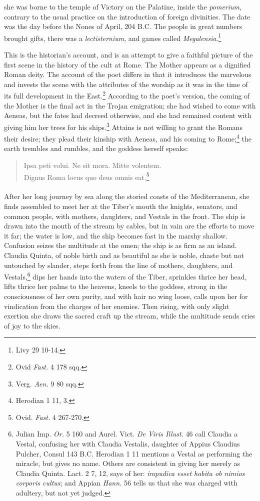 \documentclass[a4paper, 11pt, oneside, polutonikogreek, english]{article}
\begin{document}
she was borne to the temple of Victory on the Palatine, inside the \emph{pomerium}, contrary to the usual practice on the introduction of foreign divinities. The date was the day before the Nones of April, 204 \textsc{B.C.} The people in great numbers brought gifts, there was a \emph{lectisternium}, and games called \emph{Megalensia}.\footnote{Livy 29 10-14.}

This is the historian's account, and is an attempt to give a faithful picture of the first scene in the history of the cult at Rome. The Mother appears as a dignified Roman deity. The account of the poet differs in that it introduces the marvelous and invests the scene with the attributes of the worship as it was in the time of its full development in the East.\footnote{Ovid \emph{Fast.} 4 178 sqq.} According to the poet's version, the coming of the Mother is the final act in the Trojan emigration; she had wished to come with Aeneas, but the fates had decreed otherwise, and she had remained content with giving him her trees for his ships.\footnote{Verg. \emph{Aen.} 9 80 sqq.} Attains is not willing to grant the Romans their desire; they plead their kinship with Aeneas, and his coming to Rome;\footnote{Herodian 1 11, 3.} the earth trembles and rumbles, and the goddess herself speaks:
\begin{quote}
Ipsa peti volui. Ne sit mora. Mitte volentem.\\ Dignus Roma locus quo deus omnis eat.\footnote{Ovid. \emph{Fast.} 4 267-270.}  
\end{quote}
\paragraph{}
After her long journey by sea along the storied coasts of the Mediterranean, she finds assembled to meet her at the Tiber's mouth the knights, senators, and common people, with mothers, daughters, and Vestals in the front. The ship is drawn into the mouth of the stream by cables, but in vain are the efforts to move it far; the water is low, and the ship becomes fast in the marshy shallow. Confusion seizes the multitude at the omen; the ship is as firm as an island. Claudia Quinta, of noble birth and as beautiful as she is noble, chaste but not untouched by slander, steps forth from the line of mothers, daughters, and Vestals,\footnote{Julian Imp. \emph{Or.} 5 160 and Aurel. Vict. \emph{De Viris Illust.} 46 call Claudia a Vestal, confusing her with Claudia Vestalis, daughter of Appius Claudius Pulcher, Consul 143 \textsc{B.C.} Herodian 1 11 mentions a Vestal as performing the miracle, but gives no name. Others are consistent in giving her merely as Claudia Quinta. Lact. 2 7, 12, says of her: \emph{impudica esset habita ob nimios corporis cultus}; and Appian \emph{Hann.} 56 tells us that she was charged with adultery, but not yet judged.} dips her hands into the waters of the Tiber, sprinkles thrice her head, lifts thrice her palms to the heavens, kneels to the goddess, strong in the consciousness of her own purity, and with hair no wing loose, calls upon her for vindication from the charges of her enemies. Then rising, with only slight exertion she draws the sacred craft up the stream, while the multitude sends cries of joy to the skies.
\end{document}
